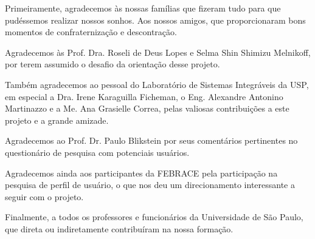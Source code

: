 

Primeiramente, agradecemos às nossas famílias que fizeram tudo para que pudéssemos realizar nossos sonhos. Aos nossos amigos, que proporcionaram bons momentos de confraternização e descontração.

Agradecemos às Prof. Dra. Roseli de Deus Lopes e Selma Shin Shimizu Melnikoff, por terem assumido o desafio da orientação desse projeto.

Também agradecemos ao pessoal do Laboratório de Sistemas Integráveis da USP, em especial a Dra. Irene Karaguilla Ficheman, o Eng. Alexandre Antonino Martinazzo e a Me. Ana Grasielle Correa, pelas valiosas contribuições a este projeto e a grande amizade. 

Agradecemos ao Prof. Dr. Paulo Blikstein por seus comentários pertinentes no questionário de pesquisa com potenciais usuários.

Agradecemos ainda aos participantes da FEBRACE pela participação na pesquisa de perfil de usuário, o que nos deu um direcionamento interessante a seguir com o projeto.

Finalmente, a todos os professores e funcionários da Universidade de São Paulo, que direta ou indiretamente contribuíram na nossa formação.
